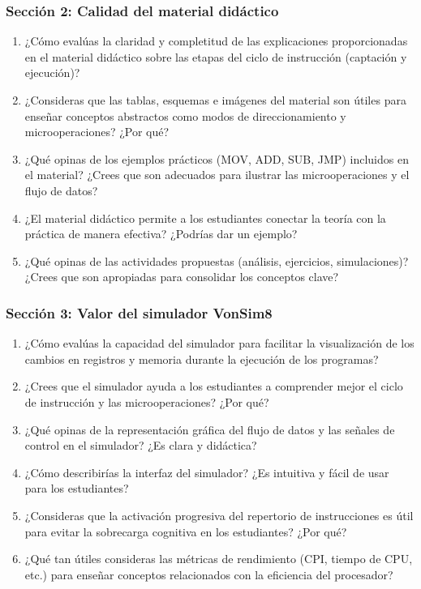 \documentclass[12pt,oneside]{templates/unerthesis}
\begin{document}
\hypertarget{secciuxf3n-2-calidad-del-material-diduxe1ctico-1}{%
\subsubsection{Sección 2: Calidad del material didáctico}\label{secciuxf3n-2-calidad-del-material-diduxe1ctico-1}}

\begin{enumerate}
\def\labelenumi{\arabic{enumi}.}
\setcounter{enumi}{3}
\item
  ¿Cómo evalúas la claridad y completitud de las explicaciones proporcionadas en el material didáctico sobre las etapas del ciclo de instrucción (captación y ejecución)?
\item
  ¿Consideras que las tablas, esquemas e imágenes del material son útiles para enseñar conceptos abstractos como modos de direccionamiento y microoperaciones? ¿Por qué?
\item
  ¿Qué opinas de los ejemplos prácticos (MOV, ADD, SUB, JMP) incluidos en el material? ¿Crees que son adecuados para ilustrar las microoperaciones y el flujo de datos?
\item
  ¿El material didáctico permite a los estudiantes conectar la teoría con la práctica de manera efectiva? ¿Podrías dar un ejemplo?
\item
  ¿Qué opinas de las actividades propuestas (análisis, ejercicios, simulaciones)? ¿Crees que son apropiadas para consolidar los conceptos clave?
\end{enumerate}

\hypertarget{secciuxf3n-3-valor-del-simulador-vonsim8-1}{%
\subsubsection{Sección 3: Valor del simulador VonSim8}\label{secciuxf3n-3-valor-del-simulador-vonsim8-1}}

\begin{enumerate}
\def\labelenumi{\arabic{enumi}.}
\setcounter{enumi}{8}
\item
  ¿Cómo evalúas la capacidad del simulador para facilitar la visualización de los cambios en registros y memoria durante la ejecución de los programas?
\item
  ¿Crees que el simulador ayuda a los estudiantes a comprender mejor el ciclo de instrucción y las microoperaciones? ¿Por qué?
\item
  ¿Qué opinas de la representación gráfica del flujo de datos y las señales de control en el simulador? ¿Es clara y didáctica?
\item
  ¿Cómo describirías la interfaz del simulador? ¿Es intuitiva y fácil de usar para los estudiantes?
\item
  ¿Consideras que la activación progresiva del repertorio de instrucciones es útil para evitar la sobrecarga cognitiva en los estudiantes? ¿Por qué?
\item
  ¿Qué tan útiles consideras las métricas de rendimiento (CPI, tiempo de CPU, etc.) para enseñar conceptos relacionados con la eficiencia del procesador?
\end{enumerate}
\end{document}
